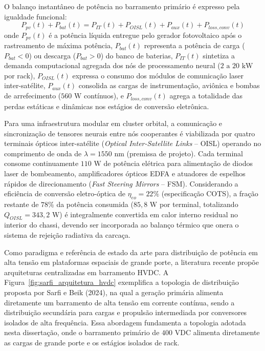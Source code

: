 O balanço instantâneo de potência no barramento primário é expresso pela igualdade funcional:
\begin{equation}
    P_{pv}(t) + P_{bat}(t) = P_{IT}(t) + P_{OISL}(t) + P_{aux}(t) + P_{loss,conv}(t)
    \label{eq:balanco_potencia_global}
\end{equation}
onde $P_{pv}(t)$ é a potência líquida entregue pelo gerador fotovoltaico após o rastreamento de máxima potência, $P_{bat}(t)$ representa a potência de carga ($P_{bat} < 0$) ou descarga ($P_{bat} > 0$) do banco de baterias, $P_{IT}(t)$ sintetiza a demanda computacional agregada dos nós de processamento neural ($2\text{ a }20\text{ kW}$ por rack), $P_{OISL}(t)$ expressa o consumo dos módulos de comunicação laser inter-satélite, $P_{aux}(t)$ consolida as cargas de instrumentação, aviônica e bombas de arrefecimento ($560\text{ W}$ contínuos), e $P_{loss,conv}(t)$ agrega a totalidade das perdas estáticas e dinâmicas nos estágios de conversão eletrônica.

Para uma infraestrutura modular em cluster orbital, a comunicação e sincronização de tensores neurais entre nós cooperantes é viabilizada por quatro terminais ópticos inter-satélite (\textit{Optical Inter-Satellite Links} -- OISL) operando no comprimento de onda de $\lambda = 1550\text{ nm}$ (premissa de projeto). Cada terminal consome continuamente $110\text{ W}$ de potência elétrica para alimentação de diodos laser de bombeamento, amplificadores ópticos EDFA e atuadores de espelhos rápidos de direcionamento (\textit{Fast Steering Mirrors} -- FSM). Considerando a eficiência de conversão eletro-óptica de $\eta_{eo} = 22\%$ (especificação COTS), a fração restante de $78\%$ da potência consumida ($85{,}8\text{ W}$ por terminal, totalizando $Q_{OISL} = 343{,}2\text{ W}$) é integralmente convertida em calor interno residual no interior do chassi, devendo ser incorporada ao balanço térmico que onera o sistema de rejeição radiativa da carcaça.

Como paradigma e referência de estado da arte para distribuição de potência em alta tensão em plataformas espaciais de grande porte, a literatura recente propõe arquiteturas centralizadas em barramento HVDC. A Figura~\ref{fig:sarfi_arquitetura_hvdc} exemplifica a topologia de distribuição proposta por Sarfi e Beik (2024), na qual a geração primária alimenta diretamente um barramento de alta tensão em corrente contínua, sendo a distribuição secundária para cargas e propulsão intermediada por conversores isolados de alta frequência. Essa abordagem fundamenta a topologia adotada nesta dissertação, onde o barramento primário de $400\text{ VDC}$ alimenta diretamente as cargas de grande porte e os estágios isolados de rack.

